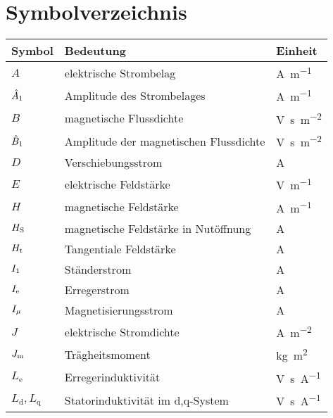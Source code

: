 
\chapter*{Symbolverzeichnis}\label{s.sym}
\begin{flushleft}
\begin{tabular}{lll}
\toprule
Symbol & Bedeutung	& Einheit\\
\midrule
$A$			&	elektrische Strombelag  	&  	\si{\ampere\per\meter} \\
$\hat{A}_{\mathrm{1}}$			&	Amplitude des Strombelages  	&  	\si{\ampere\per\meter} \\ 
$B$			&	magnetische Flussdichte		&	\si{\volt\second\per\square\meter} \\
$\hat{B}_{\mathrm{1}}$	 &	Amplitude der magnetischen Flussdichte 	&  	\si{\volt\second\per\square\meter} \\ 
$D$ & Verschiebungsstrom &  \si{\ampere} \\
$E$ & elektrische Feldstärke & \si{\volt\per\meter} \\
$H$			&	magnetische Feldstärke		&	\si{\ampere\per\meter}\\
$H_{\mathrm{S}}$	&   magnetische Feldstärke in Nutöffnung	&	\si{\ampere} \\
$H_{\mathrm{t}}$	&   Tangentiale Feldstärke	&	\si{\ampere} \\
$I_{\mathrm{1}}$	&	Ständerstrom	&	\si{\ampere} \\
$I_{\mathrm{e}}$	&	Erregerstrom	&	\si{\ampere} \\
$I_{\mathrm{\mu}}$	&	Magnetisierungsstrom	&	\si{\ampere} \\
$J$			&	elektrische Stromdichte		&	\si{\ampere\per\square\meter} \\
$J_{\mathrm{m}}$			&	Trägheitsmoment	&	\si{\kilogram\square\meter} \\
$L_\mathrm{e}$	& 	Erregerinduktivität & \si{\volt\second\per\ampere}\\
$L_\mathrm{d}, L_\mathrm{q}$	& 	Statorinduktivität im d,q-System & \si{\volt\second\per\ampere}\\

\end{tabular}
\end{flushleft}
